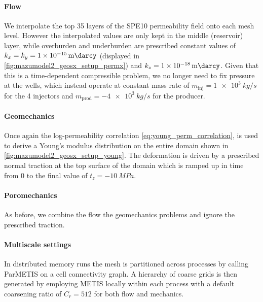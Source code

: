 \paragraph{Flow}
We interpolate the top 35 layers of the SPE10 permeability field onto each mesh level.    However the interpolated values are only kept in the middle (reservoir) layer, while overburden and underburden are prescribed constant values of $k_x = k_y = \qty{1e-15}{\milli\darcy}$ (displayed in \cref{fig:mazumodel2_geosx_setup_permx}) and $k_z = \qty{1e-18}{\milli\darcy}$.    Given that this is a time-dependent compressible problem, we no longer need to fix pressure at the wells, which instead operate at constant mass rate of $m_{\text{inj}} = \qty{1e3}{kg/s}$ for the 4 injectors and $m_{\text{prod}} = -\qty{4e3}{kg/s}$ for the producer.

\paragraph{Geomechanics}
Once again the log-permeability correlation \cref{eq:young_perm_correlation}, is used to derive a Young's modulus distribution on the entire domain shown in \cref{fig:mazumodel2_geosx_setup_young}.   The deformation is driven by a prescribed normal traction at the top surface of the domain which is ramped up in time from 0 to the final value of $t_z = -\qty{10}{MPa}$.

\paragraph{Poromechanics}
As before, we combine the flow the geomechanics problems and ignore the prescribed traction. 

\paragraph{Multiscale settings}
In distributed memory runs the mesh is partitioned across processes by calling ParMETIS on a cell connectivity graph.   A hierarchy of coarse grids is then generated by employing METIS locally within each process with a default coarsening ratio of $C_r = 512$ for both flow and mechanics.

